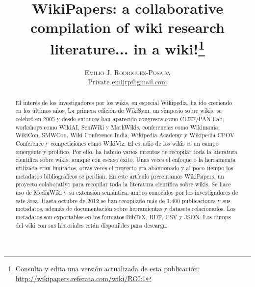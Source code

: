 \documentclass[twoside]{article}
\title{\vspace{-15mm}%
	\fontsize{24pt}{10pt}\selectfont
	\textbf{WikiPapers: a collaborative compilation of wiki research literature... in a wiki!}\thanks{Consulta y edita una versi\'{o}n actualizada de esta publicaci\'{o}n: \href{http://wikipapers.referata.com/wiki/ROI:1}{http://wikipapers.referata.com/wiki/ROI:1}}
	}
\author{%
	\large
	\textsc{Emilio J. Rodr\'{i}guez-Posada} \\ 
	\normalsize	Private 
	\normalsize	\href{mailto:emijrp@gmail.com}{emijrp@gmail.com}
	\vspace{-5mm}
	}
\date{}
\begin{document}
\maketitle
\thispagestyle{fancy}

\begin{abstract}
\noindent El inter\'{e}s de los investigadores por los wikis, en especial Wikipedia, ha ido creciendo en los \'{u}ltimos a\~{n}os. La primera edici\'{o}n de WikiSym, un simposio sobre wikis, se celebr\'{o} en 2005 y desde entonces han aparecido congresos como CLEF/PAN Lab, workshops como WikiAI, SemWiki y MathWikis, conferencias como Wikimania, WikiCon, SMWCon, Wiki Conference India, Wikipedia Academy y Wikipedia CPOV Conference y competiciones como WikiViz. El estudio de los wikis es un campo emergente y prol\'{i}fico. Por ello, ha habido varios intentos de recopilar toda la literatura cient\'{i}fica sobre wikis, aunque con escaso \'{e}xito. Unas veces el enfoque o la herramienta utilizada eran limitados, otras veces el proyecto era abandonado y al poco tiempo los metadatos bibliogr\'{a}ficos se perd\'{i}an. En este art\'{i}culo presentamos WikiPapers, un proyecto colaborativo para recopilar toda la literatura cient\'{i}fica sobre wikis. Se hace uso de MediaWiki y su extensi\'{o}n sem\'{a}ntica, ambos conocidos por los investigadores de este \'{a}rea. Hasta octubre de 2012 se han recopilado m\'{a}s de 1.400 publicaciones y sus metadatos, adem\'{a}s de documentaci\'{o}n sobre herramientas y datasets relacionados. Los metadatos son exportables en los formatos BibTeX, RDF, CSV y JSON. Los dumps del wiki con sus historiales est\'{a}n disponibles para descarga.
\end{abstract}
	
\end{document}
